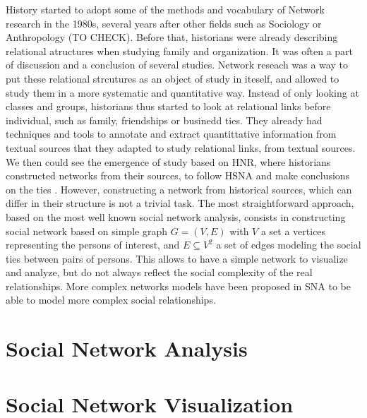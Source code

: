 History started to adopt some of the methods and vocabulary of Network research in the 1980s, several years after other fields such as Sociology or Anthropology (TO CHECK). Before that, historians were already describing relational atructures when studying family and organization. It was often a part of discussion and a conclusion of several studies. Network reseach was a way to put these relational strcutures as an object of study in iteself, and allowed to study them in a more systematic and quantitative way.
Instead of only looking at classes and groups, historians thus started to look at relational links before individual, such as family, friendships or businedd ties.
They already had techniques and tools to annotate and extract quantittative information from textual sources that they adapted to study relational links, from textual sources.
We then could see the emergence of study based on HNR, where historians constructed networks from their sources, to follow HSNA and make conclusions on the ties .
However, constructing a network from historical sources, which can differ in their structure is not a trivial task. The most straightforward approach, based on the most well known social network analysis, consists in constructing social network based on simple graph $G = (V, E)$ with $V$ a set a vertices representing the persons of interest, and $E \subseteq V^2$ a set of edges modeling the social ties between pairs of persons. This allows to have a simple network to visualize and analyze, but do not always reflect the social complexity of the real relationships. More complex networks models have been proposed in SNA to be able to model more complex social relationships.



\section{Social Network Analysis}




\section{Social Network Visualization}




